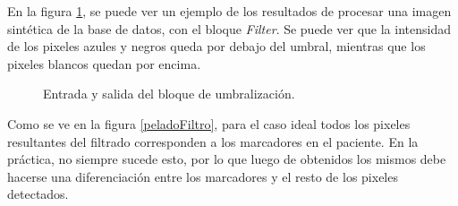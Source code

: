 En la figura \ref{ejemploUmbralizacion}, se puede ver un ejemplo de los resultados de procesar una imagen sintética de la base de datos, con el bloque \emph{Filter}. Se puede ver que la intensidad de los pixeles azules y negros queda por debajo del umbral, mientras que los pixeles blancos quedan por encima. %

\begin{figure}[H]
        \centering
         \hspace{1cm}        
  \caption{Entrada y salida del bloque de umbralización.}
      \label{ejemploUmbralizacion}
\end{figure}

Como se ve en la figura \ref{peladoFiltro}, para el caso ideal todos los pixeles resultantes del filtrado corresponden a los marcadores en el paciente. En la práctica, no siempre sucede esto, por lo que luego de obtenidos los mismos debe hacerse una diferenciación entre los marcadores y el resto de los pixeles detectados.


